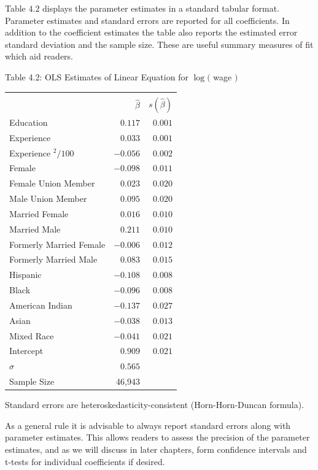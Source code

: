 \documentclass[10pt]{article}
\begin{document}
Table $4.2$ displays the parameter estimates in a standard tabular format. Parameter estimates and standard errors are reported for all coefficients. In addition to the coefficient estimates the table also reports the estimated error standard deviation and the sample size. These are useful summary measures of fit which aid readers.

Table 4.2: OLS Estimates of Linear Equation for $\log ($ wage $)$

\begin{tabular}{lrr}
\hline\hline
 &  &  \\
 & $\widehat{\beta}$ & $s(\widehat{\beta})$ \\
\cline { 2 - 3 }
Education & $0.117$ & $0.001$ \\
Experience & $0.033$ & $0.001$ \\
Experience $^{2} / 100$ & $-0.056$ & $0.002$ \\
Female & $-0.098$ & $0.011$ \\
Female Union Member & $0.023$ & $0.020$ \\
Male Union Member & $0.095$ & $0.020$ \\
Married Female & $0.016$ & $0.010$ \\
Married Male & $0.211$ & $0.010$ \\
Formerly Married Female & $-0.006$ & $0.012$ \\
Formerly Married Male & $0.083$ & $0.015$ \\
Hispanic & $-0.108$ & $0.008$ \\
Black & $-0.096$ & $0.008$ \\
American Indian & $-0.137$ & $0.027$ \\
Asian & $-0.038$ & $0.013$ \\
Mixed Race & $-0.041$ & $0.021$ \\
Intercept & $0.909$ & $0.021$ \\
$\widehat{\sigma}$ & $0.565$ &  \\
Sample Size & 46,943 &  \\
\hline
\end{tabular}

Standard errors are heteroskedasticity-consistent (Horn-Horn-Duncan formula).

As a general rule it is advisable to always report standard errors along with parameter estimates. This allows readers to assess the precision of the parameter estimates, and as we will discuss in later chapters, form confidence intervals and t-tests for individual coefficients if desired.
\end{document}
